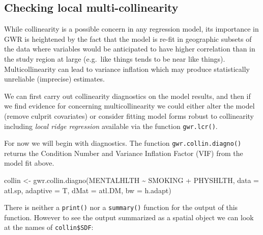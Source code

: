 \documentclass[
]{book}
\newenvironment{Shaded}{\begin{snugshade}}{\end{snugshade}}
\newcommand{\AttributeTok}[1]{\textcolor[rgb]{0.77,0.63,0.00}{#1}}
\newcommand{\FunctionTok}[1]{\textcolor[rgb]{0.00,0.00,0.00}{#1}}
\newcommand{\NormalTok}[1]{#1}
\newcommand{\OtherTok}[1]{\textcolor[rgb]{0.56,0.35,0.01}{#1}}
\newcommand{\SpecialCharTok}[1]{\textcolor[rgb]{0.00,0.00,0.00}{#1}}
\begin{document}
\hypertarget{checking-local-multi-collinearity}{%
\subsection{Checking local multi-collinearity}\label{checking-local-multi-collinearity}}

While collinearity is a possible concern in any regression model, its importance in GWR is heightened by the fact that the model is re-fit in geographic subsets of the data where variables would be anticipated to have higher correlation than in the study region at large (e.g.~like things tends to be near like things). Multicollinearity can lead to variance inflation which may produce statistically unreliable (imprecise) estimates.

We can first carry out collinearity diagnostics on the model results, and then if we find evidence for concerning multicollinearity we could either alter the model (remove culprit covariates) or consider fitting model forms robust to collinearity including \emph{local ridge regression} available via the function \texttt{gwr.lcr()}.

For now we will begin with diagnostics. The function \texttt{gwr.collin.diagno()} returns the Condition Number and Variance Inflation Factor (VIF) from the model fit above.

\begin{Shaded}
\begin{Highlighting}[]
\NormalTok{collin }\OtherTok{\textless{}{-}} \FunctionTok{gwr.collin.diagno}\NormalTok{(MENTALHLTH }\SpecialCharTok{\textasciitilde{}}\NormalTok{ SMOKING }\SpecialCharTok{+}\NormalTok{ PHYSHLTH,}
                            \AttributeTok{data =}\NormalTok{ atl.sp,}
                            \AttributeTok{adaptive =}\NormalTok{ T,}
                            \AttributeTok{dMat =}\NormalTok{ atl.DM,}
                            \AttributeTok{bw =}\NormalTok{ h.adapt)}
\end{Highlighting}
\end{Shaded}

There is neither a \texttt{print()} nor a \texttt{summary()} function for the output of this function. However to see the output summarized as a spatial object we can look at the names of \texttt{collin\$SDF}:

\begin{Shaded}
\end{Shaded}
\end{document}
